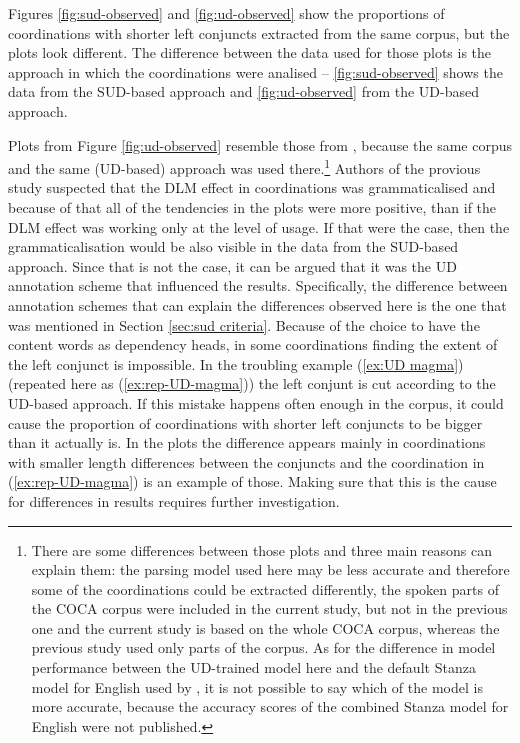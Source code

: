 Figures \ref{fig:sud-observed} and \ref{fig:ud-observed} show the proportions of coordinations with shorter left conjuncts extracted from the same corpus, but the plots look different. The difference between the data used for those plots is the approach in which the coordinations were analised -- \ref{fig:sud-observed} shows the data from the SUD-based approach and \ref{fig:ud-observed} from the UD-based approach. 

Plots from Figure \ref{fig:ud-observed} resemble those from \cite{prz:etal:24}, because the same corpus and the same (UD-based) approach was used there.\footnote{There are some differences between those plots and three main reasons can explain them: the parsing model used here may be less accurate and therefore some of the coordinations could be extracted differently, the spoken parts of the COCA corpus were included in the current study, but not in the previous one and the current study is based on the whole COCA corpus, whereas the previous study used only parts of the corpus. As for the difference in model performance between the UD-trained model here and the default Stanza model for English used by \cite{prz:etal:24}, it is not possible to say which of the model is more accurate, because the accuracy scores of the combined Stanza model for English were not published.} Authors of the provious study suspected that the DLM effect in coordinations was grammaticalised and because of that all of the tendencies in the plots were more positive, than if the DLM effect was working only at the level of usage. If that were the case, then the grammaticalisation would be also visible in the data from the SUD-based approach. Since that is not the case, it can be argued that it was the UD annotation scheme that influenced the results.
Specifically, the difference between annotation schemes that can explain the differences observed here is the one that was mentioned in Section \ref{sec:sud criteria}. Because of the choice to have the content words as dependency heads, in some coordinations finding the extent of the left conjunct is impossible. In the troubling example (\ref{ex:UD magma}) (repeated here as (\ref{ex:rep-UD-magma})) the left conjunt is cut according to the UD-based approach. If this mistake happens often enough in the corpus, it could cause the proportion of coordinations with shorter left conjuncts to be bigger than it actually is. In the plots the difference appears mainly in coordinations with smaller length differences between the conjuncts and the coordination in (\ref{ex:rep-UD-magma}) is an example of those. Making sure that this is the cause for differences in results requires further investigation. 

